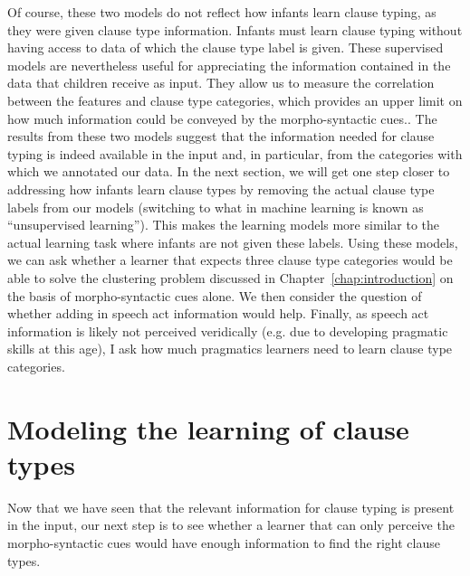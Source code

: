 
Of course, these two models do not reflect how infants learn clause typing, as they were given clause type information. Infants must learn clause typing without having access to data of which the clause type label is given. These supervised models are nevertheless useful for appreciating the information contained in the data that children receive as input. They allow us to measure the correlation between the features and clause type categories, which provides an upper limit on how much information could be conveyed by the morpho-syntactic cues.. The results from these two models suggest that the information needed for clause typing is indeed available in the input and, in particular, from the categories with which we annotated our data. In the next section, we will get one step closer to addressing how infants learn clause types by removing the actual clause type labels from our models (switching to what in machine learning is known as ``unsupervised learning''). This makes the learning models more similar to the actual learning task where infants are not given these labels. Using these models, we can ask whether a learner that expects three clause type categories would be able to solve the clustering problem discussed in Chapter~\ref{chap:introduction} on the basis of morpho-syntactic cues alone. We then consider the question of whether adding in speech act information would help. Finally, as speech act information is likely not perceived veridically (e.g. due to developing pragmatic skills at this age), I ask how much pragmatics learners need to learn clause type categories. 


\section{Modeling the learning of clause types}
\label{sec:engcl:model}
Now that we have seen that the relevant information for clause typing is present in the input, our next step is to see whether a learner that can only perceive the morpho-syntactic cues would have enough information to find the right clause types. 

